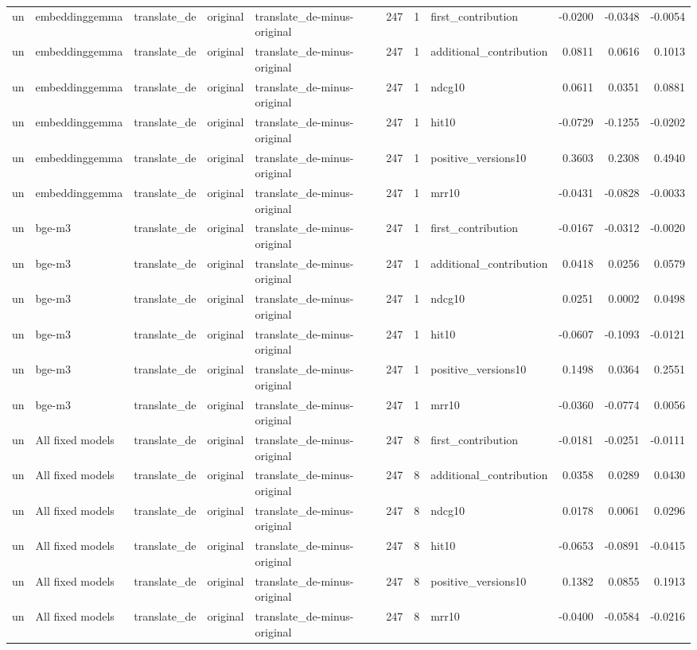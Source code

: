\begin{tabular}{lllllrrlrrr}
un & embeddinggemma & translate\_de & original & translate\_de-minus-original & 247 & 1 & first\_contribution & -0.0200 & -0.0348 & -0.0054 \\
un & embeddinggemma & translate\_de & original & translate\_de-minus-original & 247 & 1 & additional\_contribution & 0.0811 & 0.0616 & 0.1013 \\
un & embeddinggemma & translate\_de & original & translate\_de-minus-original & 247 & 1 & ndcg10 & 0.0611 & 0.0351 & 0.0881 \\
un & embeddinggemma & translate\_de & original & translate\_de-minus-original & 247 & 1 & hit10 & -0.0729 & -0.1255 & -0.0202 \\
un & embeddinggemma & translate\_de & original & translate\_de-minus-original & 247 & 1 & positive\_versions10 & 0.3603 & 0.2308 & 0.4940 \\
un & embeddinggemma & translate\_de & original & translate\_de-minus-original & 247 & 1 & mrr10 & -0.0431 & -0.0828 & -0.0033 \\
un & bge-m3 & translate\_de & original & translate\_de-minus-original & 247 & 1 & first\_contribution & -0.0167 & -0.0312 & -0.0020 \\
un & bge-m3 & translate\_de & original & translate\_de-minus-original & 247 & 1 & additional\_contribution & 0.0418 & 0.0256 & 0.0579 \\
un & bge-m3 & translate\_de & original & translate\_de-minus-original & 247 & 1 & ndcg10 & 0.0251 & 0.0002 & 0.0498 \\
un & bge-m3 & translate\_de & original & translate\_de-minus-original & 247 & 1 & hit10 & -0.0607 & -0.1093 & -0.0121 \\
un & bge-m3 & translate\_de & original & translate\_de-minus-original & 247 & 1 & positive\_versions10 & 0.1498 & 0.0364 & 0.2551 \\
un & bge-m3 & translate\_de & original & translate\_de-minus-original & 247 & 1 & mrr10 & -0.0360 & -0.0774 & 0.0056 \\
un & All fixed models & translate\_de & original & translate\_de-minus-original & 247 & 8 & first\_contribution & -0.0181 & -0.0251 & -0.0111 \\
un & All fixed models & translate\_de & original & translate\_de-minus-original & 247 & 8 & additional\_contribution & 0.0358 & 0.0289 & 0.0430 \\
un & All fixed models & translate\_de & original & translate\_de-minus-original & 247 & 8 & ndcg10 & 0.0178 & 0.0061 & 0.0296 \\
un & All fixed models & translate\_de & original & translate\_de-minus-original & 247 & 8 & hit10 & -0.0653 & -0.0891 & -0.0415 \\
un & All fixed models & translate\_de & original & translate\_de-minus-original & 247 & 8 & positive\_versions10 & 0.1382 & 0.0855 & 0.1913 \\
un & All fixed models & translate\_de & original & translate\_de-minus-original & 247 & 8 & mrr10 & -0.0400 & -0.0584 & -0.0216 \\
\bottomrule
\end{tabular}
